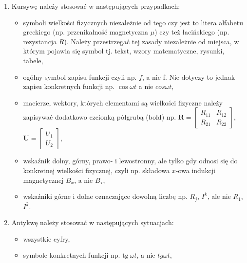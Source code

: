 \documentclass[12pt,twoside]{article}
\begin{document}
\begin{enumerate}[label=\arabic*), leftmargin=1.25cm]
\item Kursywę należy stosować w następujących przypadkach:

\begin{itemize}[label=-,labelsep=0.4cm,leftmargin=0.6cm] %
\item symboli wielkości fizycznych niezależnie od tego czy jest to litera alfabetu greckiego (np. przenikalność magnetyczna $\mu$) czy też łacińskiego (np. rezystancja $R$). Należy przestrzegać tej zasady niezależnie od miejsca, w którym pojawia się symbol tj. tekst, wzory matematyczne, rysunki, tabele,

\item ogólny symbol zapisu funkcji czyli np. $f$, a nie f. Nie dotyczy to jednak zapisu konkretnych funkcji np. $\cos \omega t$ a nie $cos \omega t$,

\item macierze, wektory, których elementami są wielkości fizyczne należy zapisywać dodatkowo czcionką półgrubą (bold) np. 
$\bm{R} = \left[ 
\begin{array}{cc}
R_{11} & R_{12} \\
R_{21} & R_{22} 
\end{array} 
\right]$,
$\bm{U} = \left[ 
\begin{array}{c}
U_{1} \\
U_{2} 
\end{array} 
\right]$,

\item wskaźnik dolny, górny, prawo- i lewostronny, ale tylko gdy odnosi się do konkretnej wielkości fizycznej, czyli np. składowa $x$-owa indukcji magnetycznej $B_x$, a nie $B_{\mathrm{x}}$,

\item wskaźniki górne i dolne oznaczające dowolną liczbę np. $R_j$, $I^k$, ale nie $R_\mathit{1}$, $I^\mathit{2}$.

\end{itemize}

\item Antykwę należy stosować w następujących sytuacjach:

\begin{itemize}[label=-,labelsep=0.4cm,leftmargin=0.6cm]
\item wszystkie cyfry,

\item symbole konkretnych funkcji np. $\mathrm{tg\ } \omega t$, a nie $tg \omega t$,


\end{itemize}
\end{enumerate}
\end{document}
